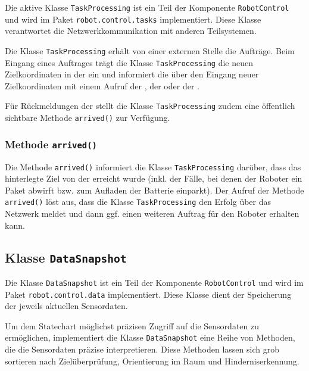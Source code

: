 Die aktive Klasse \texttt{TaskProcessing} ist ein Teil der Komponente \texttt{RobotControl} und wird im Paket \texttt{robot.control.tasks} implementiert. 
Diese Klasse verantwortet die Netzwerkkommunikation mit anderen Teilsystemen.

Die Klasse \texttt{TaskProcessing} erhält von einer externen Stelle die Aufträge. 
Beim Eingang eines Auftrages trägt die Klasse \texttt{TaskProcessing} die neuen Zielkoordinaten in der  ein und informiert die  über den Eingang neuer Zielkoordinaten mit einem Aufruf der , der  oder der .

Für Rückmeldungen der  stellt die Klasse \texttt{TaskProcessing} zudem eine öffentlich sichtbare Methode \texttt{arrived()} zur Verfügung.


\subsubsection{Methode \texttt{arrived()}}
\label{method:arrived}

Die Methode \texttt{arrived()} informiert die Klasse \texttt{TaskProcessing} darüber, dass das hinterlegte Ziel von der  erreicht wurde (inkl. der Fälle, bei denen der Roboter ein Paket abwirft bzw. zum Aufladen der Batterie einparkt).
Der Aufruf der Methode \texttt{arrived()} löst aus, dass die Klasse \texttt{TaskProcessing} den Erfolg über das Netzwerk meldet und dann ggf. einen weiteren Auftrag für den Roboter erhalten kann.



\subsection{Klasse \texttt{DataSnapshot}}
\label{class:data}

Die Klasse \texttt{DataSnapshot} ist ein Teil der Komponente \texttt{RobotControl} und wird im Paket \texttt{robot.control.data} implementiert. 
Diese Klasse dient der Speicherung der jeweils aktuellen Sensordaten.

Um dem Statechart möglichst präzisen Zugriff auf die Sensordaten zu ermöglichen, implementiert die Klasse \texttt{DataSnapshot} eine Reihe von Methoden, die die Sensordaten präzise interpretieren.
Diese Methoden lassen sich grob sortieren nach Zielüberprüfung, Orientierung im Raum und Hinderniserkennung.

